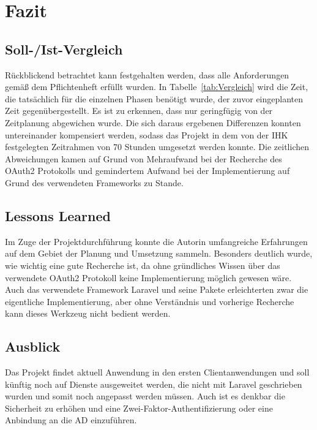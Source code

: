 \section{Fazit} 
\label{sec:Fazit}

\subsection{Soll-/Ist-Vergleich}
\label{sec:SollIstVergleich}
Rückblickend betrachtet kann festgehalten werden, dass alle Anforderungen gemäß dem Pflichtenheft erfüllt wurden. 
In Tabelle~\ref{tab:Vergleich} wird die Zeit, die tatsächlich für die einzelnen Phasen benötigt wurde, der zuvor eingeplanten Zeit gegenübergestellt. 
Es ist zu erkennen, dass nur geringfügig von der Zeitplanung abgewichen wurde. Die sich daraus ergebenen Differenzen konnten untereinander kompensiert werden, sodass das Projekt in dem von der IHK festgelegten Zeitrahmen von 70 Stunden umgesetzt werden konnte.
Die zeitlichen Abweichungen kamen auf Grund von Mehraufwand bei der Recherche des OAuth2 Protokolls und gemindertem Aufwand bei der Implementierung auf Grund des verwendeten Frameworks zu Stande.

\subsection{Lessons Learned}
\label{sec:LessonsLearned}
Im Zuge der Projektdurchführung konnte die Autorin umfangreiche Erfahrungen auf dem Gebiet der Planung und Umsetzung sammeln.
Besonders deutlich wurde, wie wichtig eine gute Recherche ist, da ohne gründliches Wissen über das verwendete OAuth2 Protokoll keine Implementierung möglich gewesen wäre.
Auch das verwendete Framework Laravel und seine Pakete erleichterten zwar die eigentliche Implementierung, aber ohne Verständnis und vorherige Recherche kann dieses Werkzeug nicht bedient werden. 
\subsection{Ausblick}
\label{sec:Ausblick}
Das Projekt findet aktuell Anwendung in den ersten Clientanwendungen und soll künftig noch auf Dienste ausgeweitet werden, die nicht mit Laravel geschrieben wurden und somit noch angepasst werden müssen. Auch ist es denkbar die Sicherheit zu erhöhen und eine Zwei-Faktor-Authentifizierung oder eine Anbindung an die AD einzuführen.
